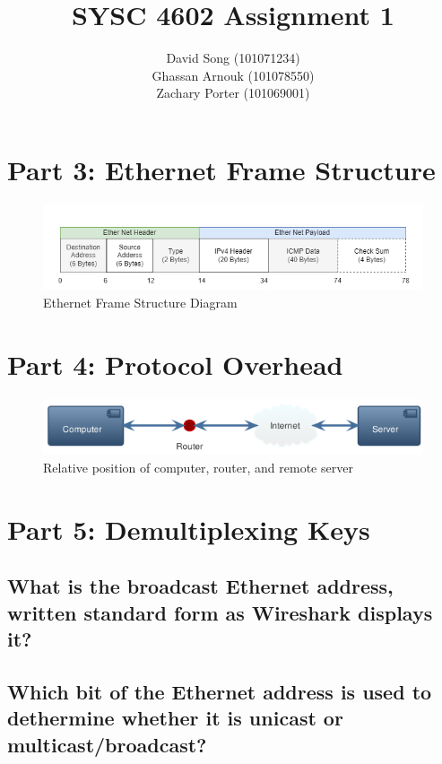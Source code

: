 \documentclass{article}
\begin{document}
    \title  { \textbf{SYSC 4602 Assignment 1} }
    \author {
        David Song (101071234)\\
        Ghassan Arnouk (101078550)\\
        Zachary Porter (101069001)
    }
     
    \maketitle
    
    \clearpage
    \section*{Part 3: Ethernet Frame Structure}
    \begin{figure}[htbp]
        \centering
        \includegraphics[width=\textwidth]{images/assignment3-part3.drawio.png}
        \caption{Ethernet Frame Structure Diagram}
    \end{figure}
    \section*{Part 4: Protocol Overhead}
    \begin{figure}[htbp]
        \centering
        \includegraphics[width=\textwidth]{images/assignment3-part4.plantuml.png}
        \caption{Relative position of computer, router, and remote server}
    \end{figure}

    \section*{Part 5: Demultiplexing Keys}
    \subsection{What is the broadcast Ethernet address, written standard form as Wireshark displays it?}

    \subsection{Which bit of the Ethernet address is used to dethermine whether it is unicast or multicast/broadcast?}
\end{document}
